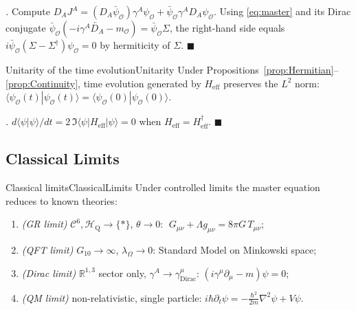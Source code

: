 \documentclass[11pt,a4paper]{article}
\theoremstyle{myrmk}
\renewenvironment{proof}[1][\proofname]{%
  \par\noindent\textit{#1.}\enspace\ignorespaces}{\hfill$\blacksquare$\par\medskip}
\newcommand{\cC}{\mathcal{C}^{6}}
\newcommand{\HH}{\mathcal{H}_{\mathrm{Q}}}
\begin{document}
\begin{proof}
Compute $D_A J^A=(D_A\bar\psi_{\mathcal{O}})\gamma^A\psi_{\mathcal{O}}
+\bar\psi_{\mathcal{O}}\gamma^A D_A\psi_{\mathcal{O}}$. Using \eqref{eq:master} and
its Dirac conjugate $\bar\psi_{\mathcal{O}}(-i\gamma^A\overleftarrow{D_A}-m_{\mathcal{O}})
=\bar\psi_{\mathcal{O}}\Sigma$, the right-hand side equals
$i\bar\psi_{\mathcal{O}}(\Sigma-\Sigma^\dagger)\psi_{\mathcal{O}}=0$ by hermiticity of
$\Sigma$.
\end{proof}

\begin{corollary}{Unitarity of the time evolution}{Unitarity}
Under Propositions~\ref{prop:Hermitian}--\ref{prop:Continuity}, time evolution
generated by $H_{\mathrm{eff}}$ preserves the $L^2$ norm:
$\langle\psi_{\mathcal{O}}(t)|\psi_{\mathcal{O}}(t)\rangle=\langle\psi_{\mathcal{O}}(0)|\psi_{\mathcal{O}}(0)\rangle$.
\end{corollary}

\begin{proof}
$d\langle\psi|\psi\rangle/dt=2\,\Im\langle\psi|H_{\mathrm{eff}}|\psi\rangle=0$ when
$H_{\mathrm{eff}}=H_{\mathrm{eff}}^\dagger$.
\end{proof}

\subsection{Classical Limits}

\begin{theorem}{Classical limits}{ClassicalLimits}
Under controlled limits the master equation reduces to known theories:
\begin{enumerate}[label=\textup{(\roman*)}]
  \item \emph{(GR limit)} $\cC,\HH\to\{*\}$, $\theta\to 0$:
    $\;G_{\mu\nu}+\Lambda g_{\mu\nu}=8\pi G\,T_{\mu\nu}$;
  \item \emph{(QFT limit)} $G_{10}\to\infty$, $\lambda_\Omega\to 0$:
    Standard Model on Minkowski space;
  \item \emph{(Dirac limit)} $\mathbb{R}^{1,3}$ sector only,
    $\gamma^A\to\gamma^\mu_{\mathrm{Dirac}}$:
    $(i\gamma^\mu\partial_\mu-m)\psi=0$;
  \item \emph{(QM limit)} non-relativistic, single particle:
    $i\hbar\partial_t\psi=-\frac{\hbar^2}{2m}\nabla^2\psi+V\psi$.
\end{enumerate}
\end{theorem}
\end{document}
